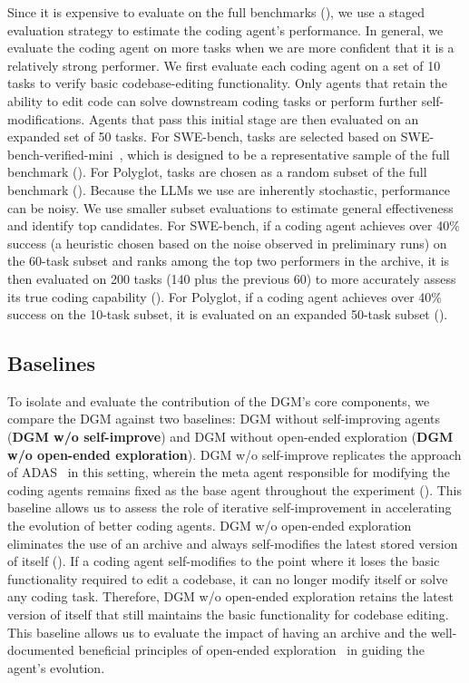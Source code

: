 Since it is expensive to evaluate on the full benchmarks (), we use a staged evaluation strategy to estimate the coding agent's performance. In general, we evaluate the coding agent on more tasks when we are more confident that it is a relatively strong performer. We first evaluate each coding agent on a set of 10 tasks to verify basic codebase-editing functionality. Only agents that retain the ability to edit code can solve downstream coding tasks or perform further self-modifications. Agents that pass this initial stage are then evaluated on an expanded set of 50 tasks. For SWE-bench, tasks are selected based on SWE-bench-verified-mini~\citep{hobbhahn2025swebenchmini}, which is designed to be a representative sample of the full benchmark (). For Polyglot, tasks are chosen as a random subset of the full benchmark (). Because the LLMs we use are inherently stochastic, performance can be noisy. We use smaller subset evaluations to estimate general effectiveness and identify top candidates. For SWE-bench, if a coding agent achieves over 40\% success (a heuristic chosen based on the noise observed in preliminary runs) on the 60-task subset and ranks among the top two performers in the archive, it is then evaluated on 200 tasks (140 plus the previous 60) to more accurately assess its true coding capability (). For Polyglot, if a coding agent achieves over 40\% success on the 10-task subset, it is evaluated on an expanded 50-task subset ().

\subsection{Baselines}
\label{sec:baselines}

To isolate and evaluate the contribution of the DGM's core components, we compare the DGM against two baselines: DGM without self-improving agents (\textbf{DGM w/o self-improve}) and DGM without open-ended exploration (\textbf{DGM w/o open-ended exploration}). DGM w/o self-improve replicates the approach of ADAS~\citep{hu2025automated} in this setting, wherein the meta agent responsible for modifying the coding agents remains fixed as the base agent throughout the experiment (). This baseline allows us to assess the role of iterative self-improvement in accelerating the evolution of better coding agents. DGM w/o open-ended exploration eliminates the use of an archive and always self-modifies the latest stored version of itself (). If a coding agent self-modifies to the point where it loses the basic functionality required to edit a codebase, it can no longer modify itself or solve any coding task. Therefore, DGM w/o open-ended exploration retains the latest version of itself that still maintains the basic functionality for codebase editing. This baseline allows us to evaluate the impact of having an archive and the well-documented beneficial principles of open-ended exploration~\citep{clune2019ai, stanley2015greatness, zhang2024omni, fernandopromptbreeder, lee2020learning, samvelyan2024rainbow, colas2022autotelic} in guiding the agent's evolution.

